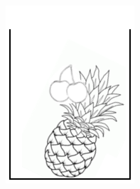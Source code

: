 \begin{figure}[!htb]
    \centering
    \begin{subfigure}{.30\linewidth}
        \centering
        \includegraphics[width=\linewidth]{img/FreezeC.png}
    \end{subfigure}%
    ~ 
    \begin{subfigure}{.30\linewidth}
        \centering

\end{subfigure}
\end{figure}
